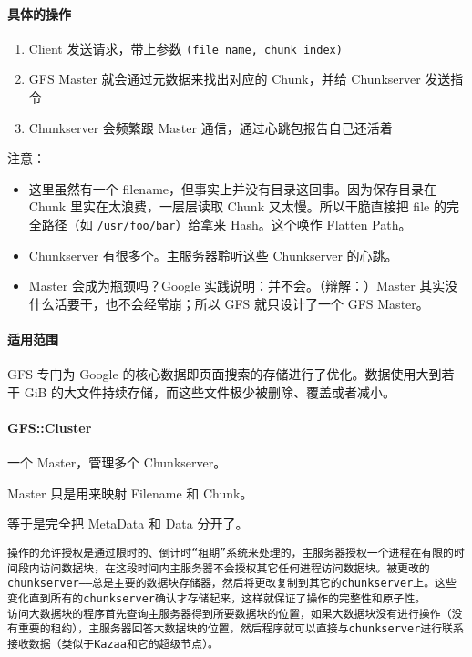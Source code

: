 \documentclass[
]{article}
\begin{document}
\hypertarget{header-n177}{%
\paragraph{具体的操作}\label{header-n177}}

\begin{enumerate}
\def\labelenumi{\arabic{enumi}.}
\item
  Client 发送请求，带上参数 \texttt{(file\ name,\ chunk\ index)}
\item
  GFS Master 就会通过元数据来找出对应的 Chunk，并给 Chunkserver 发送指令
\item
  Chunkserver 会频繁跟 Master 通信，通过心跳包报告自己还活着
\end{enumerate}

注意：

\begin{itemize}
\item
  这里虽然有一个 filename，但事实上并没有目录这回事。因为保存目录在
  Chunk 里实在太浪费，一层层读取 Chunk 又太慢。所以干脆直接把 file
  的完全路径（如 \texttt{/usr/foo/bar}）给拿来 Hash。这个唤作 Flatten
  Path。
\item
  Chunkserver 有很多个。主服务器聆听这些 Chunkserver 的心跳。
\item
  Master 会成为瓶颈吗？Google 实践说明：并不会。（辩解：）Master
  其实没什么活要干，也不会经常崩；所以 GFS 就只设计了一个 GFS Master。 
\end{itemize}

\hypertarget{header-n193}{%
\paragraph{适用范围}\label{header-n193}}

GFS 专门为 Google 的核心数据即页面搜索的存储进行了优化。数据使用大到若干
GiB 的大文件持续存储，而这些文件极少被删除、覆盖或者减小。

\hypertarget{header-n195}{%
\paragraph{GFS::Cluster}\label{header-n195}}

一个 Master，管理多个 Chunkserver。

Master 只是用来映射 Filename 和 Chunk。

等于是完全把 MetaData 和 Data 分开了。

\begin{verbatim}
操作的允许授权是通过限时的、倒计时“租期”系统来处理的，主服务器授权一个进程在有限的时间段内访问数据块，在这段时间内主服务器不会授权其它任何进程访问数据块。被更改的chunkserver——总是主要的数据块存储器，然后将更改复制到其它的chunkserver上。这些变化直到所有的chunkserver确认才存储起来，这样就保证了操作的完整性和原子性。
访问大数据块的程序首先查询主服务器得到所要数据块的位置，如果大数据块没有进行操作（没有重要的租约），主服务器回答大数据块的位置，然后程序就可以直接与chunkserver进行联系接收数据（类似于Kazaa和它的超级节点）。
\end{verbatim}
\end{document}
